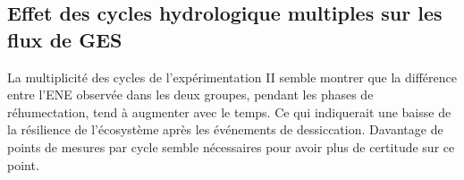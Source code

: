 %
%
%
%
%
%
%

\subsection{Effet des cycles hydrologique multiples sur les flux de GES}

La multiplicité des cycles de l'expérimentation II semble montrer que la différence entre l'ENE observée dans les deux groupes, pendant les phases de réhumectation, tend à augmenter avec le temps.
Ce qui indiquerait une baisse de la résilience de l'écosystème après les événements de dessiccation.
Davantage de points de mesures par cycle semble nécessaires pour avoir plus de certitude sur ce point.

